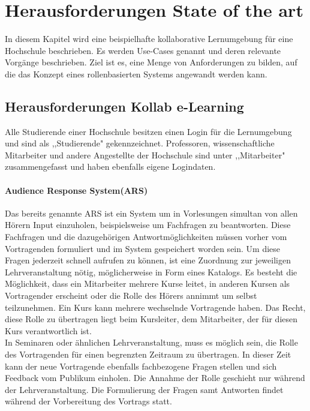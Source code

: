 \documentclass[conference]{IEEEtran}
\begin{document}
\section{Herausforderungen State of the art}
In diesem Kapitel wird eine beispielhafte kollaborative Lernumgebung für eine Hochschule beschrieben. Es werden Use-Cases genannt und deren relevante Vorgänge beschrieben. %
Ziel ist es, eine Menge von Anforderungen zu bilden, auf die das Konzept eines rollenbasierten Systems angewandt werden kann. 

\subsection{Herausforderungen Kollab e-Learning} 
Alle Studierende einer Hochschule besitzen einen Login für die Lernumgebung und sind als ,,Studierende" gekennzeichnet. Professoren, wissenschaftliche Mitarbeiter und andere Angestellte der Hochschule sind unter ,,Mitarbeiter" zusammengefasst und haben ebenfalls eigene Logindaten.  
\paragraph{Audience Response System(ARS)} Das bereits genannte ARS ist ein System um in Vorlesungen simultan von allen Hörern Input einzuholen, beispielsweise um Fachfragen zu beantworten. Diese Fachfragen und die dazugehörigen Antwortmöglichkeiten müssen vorher vom Vortragenden formuliert und im System gespeichert worden sein. Um diese Fragen jederzeit schnell aufrufen zu können, ist eine Zuordnung zur jeweiligen Lehrveranstaltung nötig, möglicherweise in Form eines Katalogs. Es besteht die Möglichkeit, dass ein Mitarbeiter mehrere Kurse leitet, in anderen Kursen als Vortragender erscheint oder die Rolle des Hörers annimmt um selbst teilzunehmen. Ein Kurs kann mehrere wechselnde Vortragende haben. Das Recht, diese Rolle zu übertragen liegt beim Kursleiter, dem Mitarbeiter, der für diesen Kurs verantwortlich ist.\\ In Seminaren oder ähnlichen Lehrveranstaltung, muss es möglich sein, die Rolle des Vortragenden für einen begrenzten Zeitraum zu übertragen. In dieser Zeit kann der neue Vortragende ebenfalls fachbezogene Fragen stellen und sich Feedback vom Publikum einholen. Die Annahme der Rolle geschieht nur während der Lehrveranstaltung. Die Formulierung der Fragen samt Antworten findet während der Vorbereitung des Vortrags statt. 
\end{document}

